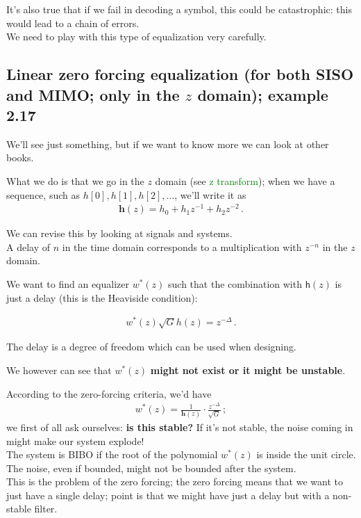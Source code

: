 \documentclass[a4paper, 12pt]{book}
\begin{document}
It's also true that if we fail in decoding a symbol, this could be catastrophic: this would lead to a chain of errors.\\
We need to play with this type of equalization very carefully.

\subsection[Linear zero forcing equalization]{Linear zero forcing equalization (for both SISO and MIMO; only in the $z$ domain); example 2.17}

We'll see just something, but if we want to know more we can look at other books.

What we do is that we go in the $z$ domain (see \textcolor{green}{z transform}); when we have a sequence, such as $h[0], h[1], h[2], \dots$, we'll write it as
\begin{align}
    \mathbf{h}(z) = h_0 + h_1 z^{-1} + h_2 z^{-2} \,.
\end{align}

\vspace{0.5em}
\noindent
\colorbox{obsidianGreen}{%
    \begin{minipage}{\dimexpr\linewidth-2\fboxsep}
    We can revise this by looking at signals and systems.\\
    A delay of $n$ in the time domain corresponds to a multiplication with $z^{-n}$ in the $z$ domain.
    \end{minipage}%
}
\vspace{0.5em}

We want to find an equalizer $w^*(z)$ such that the combination with $\mathsf{h}(z)$ is just a delay (this is the Heaviside condition):

\begin{align}
    w^*(z)\sqrt{G}h(z) = z^{-\Delta} \,. \tag{2.124}
\end{align}

The delay is a degree of freedom which can be used when designing.

We however can see that $w^*(z)$ \textbf{might not exist or it might be unstable}.

According to the zero-forcing criteria, we'd have
\begin{align}
    w^*(z) = \frac{1}{\mathbf{h}(z)} \cdot \frac{z^{-\Delta}}{\sqrt{G}} \,;
\end{align}
we first of all ask ourselves: \textbf{is this stable?} If it's not stable, the noise coming in might make our system explode!\\
The system is BIBO if the root of the polynomial $w^*(z)$ is inside the unit circle. The noise, even if bounded, might not be bounded after the system.\\
This is the problem of the zero forcing; the zero forcing means that we want to just have a single delay; point is that we might have just a delay but with a non-stable filter.
\end{document}
